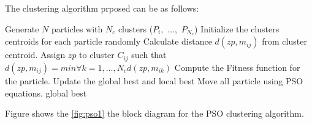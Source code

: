 \documentclass[a4paper,twoside]{article}
\begin{document}
The clustering algorithm prposed can be as follows:
\begin{algorithmic}
\STATE  Generate $N$ particles with $N_c$ clusters  ($P_i,$ $\dots,$ $P_{N_c}$)
\STATE Initialize the clusters centroids for each particle randomly
        \STATE   Calculate distance $d(zp,m_{ij})$ from cluster centroid.
        \STATE   Assign $zp$ to cluster $C_{ij}$ such that
        \STATE   $d(zp,m_{ij})=min \forall k=1,\dots,N_c {d(zp,m_{ik})}$
    \ENDFOR
    \STATE  Compute the Fitness function for the particle.
     \STATE  Update the global best and local best
     \STATE  Move all particle using PSO equations.
     \ENDFOR
  \ENDFOR
 \RETURN global best

 \end{algorithmic}

 Figure shows the \ref{fig:pso1} the block diagram for the PSO clustering algorithm. 
\end{document}
